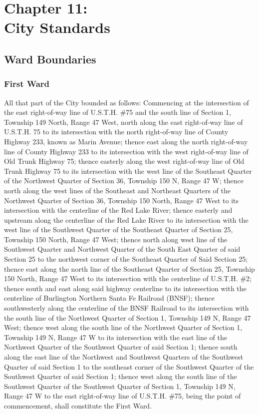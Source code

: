 \chapter*{Chapter 11: \\
	City Standards}
    \minitoc
    \pagebreak
    
\section{Ward Boundaries}
\subsection{First Ward}
All that part of the City bounded as follows:  Commencing at the intersection of the east right-of-way line of U.S.T.H. \#75 and the south line of Section 1, Township 149 North, Range 47 West, north along the east right-of-way line of U.S.T.H. 75 to its intersection with the north right-of-way line of County Highway 233, known as Marin Avenue; thence east along the north right-of-way line of County Highway 233 to its intersection with the west right-of-way line of Old Trunk Highway 75; thence easterly along the west right-of-way line of Old Trunk Highway 75 to its intersection with the west line of the Southeast Quarter of the Northwest Quarter of Section 36, Township 150 N, Range 47 W; thence north along the west lines of the Southeast and Northeast Quarters of the Northwest Quarter of Section 36, Township 150 North, Range 47 West to its intersection with the centerline of the Red Lake River; thence easterly and  upstream along the centerline of the Red Lake River to its intersection with the west line of the Southwest Quarter of the Southeast Quarter  of Section 25, Township 150 North, Range 47 West; thence north along west line of the Southwest Quarter and Northwest Quarter of the South East Quarter of said Section 25 to the northwest corner of the Southeast Quarter of Said Section 25; thence east along the north line of the Southeast Quarter of Section 25, Township 150 North, Range 47 West to its intersection with the centerline of U.S.T.H. \#2; thence south and east along said highway centerline to its intersection with the centerline of Burlington Northern Santa Fe Railroad (BNSF); thence southwesterly along the centerline of the BNSF Railroad to its intersection with the south line of the Northwest Quarter of Section 1, Township 149 N, Range 47 West; thence west along the south line of the Northwest Quarter of Section 1, Township 149 N, Range 47 W to its intersection with the east line of the Northwest Quarter of the Southwest Quarter of  said Section 1; thence south along the east line of the Northwest and Southwest Quarters of the Southwest Quarter of said Section 1 to the southeast corner of the Southwest Quarter of the Southwest Quarter of  said Section 1; thence west along the south line of the Southwest Quarter of the Southwest Quarter of Section 1, Township 149 N, Range 47 W to the east right-of-way line of U.S.T.H. \#75, being the point of commencement, shall constitute the First Ward.

